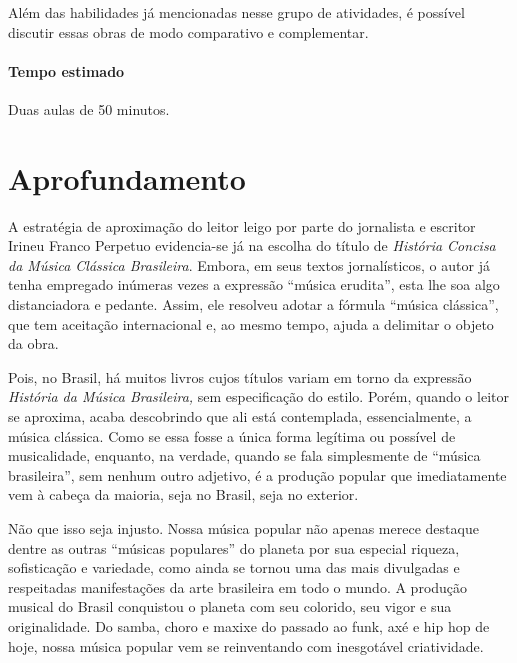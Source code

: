 \documentclass[11pt]{extarticle}
\begin{document}
Além das habilidades já mencionadas nesse grupo de atividades, é possível discutir essas obras de modo comparativo e complementar.

\paragraph{Tempo estimado} Duas aulas de 50 minutos.


\section{Aprofundamento}

A estratégia de aproximação do leitor leigo por parte do jornalista e
escritor Irineu Franco Perpetuo evidencia-se já na escolha do título de
\emph{História Concisa da Música Clássica Brasileira}. Embora, em seus
textos jornalísticos, o autor já tenha empregado inúmeras vezes a
expressão ``música erudita'', esta lhe soa algo distanciadora e pedante.
Assim, ele resolveu adotar a fórmula ``música clássica'', que tem
aceitação internacional e, ao mesmo tempo, ajuda a delimitar o objeto da
obra.

Pois, no Brasil, há muitos livros cujos títulos variam em torno da
expressão \emph{História da Música Brasileira,} sem especificação do
estilo. Porém, quando o leitor se aproxima, acaba descobrindo que ali
está contemplada, essencialmente, a música clássica. Como se essa fosse
a única forma legítima ou possível de musicalidade, enquanto, na
verdade, quando se fala simplesmente de ``música brasileira'', sem
nenhum outro adjetivo, é a produção popular que imediatamente vem à
cabeça da maioria, seja no Brasil, seja no exterior.


Não que isso seja injusto. Nossa música popular não apenas merece
destaque dentre as outras ``músicas populares'' do planeta por sua
especial riqueza, sofisticação e variedade, como ainda se tornou uma das
mais divulgadas e respeitadas manifestações da arte brasileira em todo o
mundo. A produção musical do Brasil conquistou o planeta com seu
colorido, seu vigor e sua originalidade. Do samba, choro e maxixe do
passado ao funk, axé e hip hop de hoje, nossa música popular vem se
reinventando com inesgotável criatividade.
\end{document}
